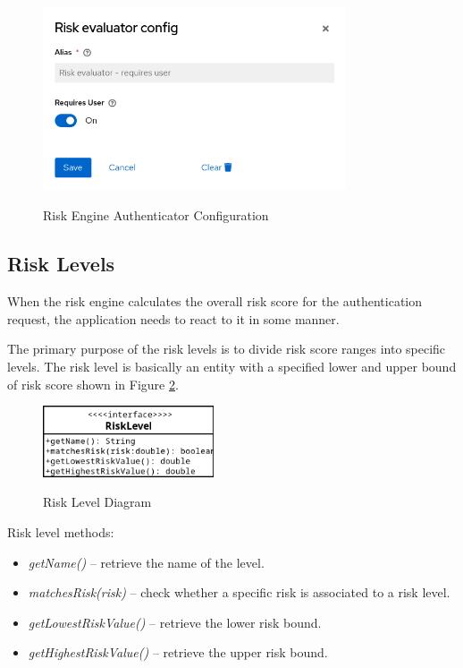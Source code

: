 \begin{figure}[htbp]
  \centering
  \includegraphics[width=0.8\textwidth]{img/sections/5-design/risk-evaluator-authenticator-config.png}
  \label{fig:risk-evaluator-authenticator-config}
  \caption{Risk Engine Authenticator Configuration}
\end{figure}

\newpage

\subsection{Risk Levels} \label{risk-levels}
When the risk engine calculates the overall risk score for the authentication request, the application needs to react to it in some manner.

The primary purpose of the risk levels is to divide risk score ranges into specific levels.
The risk level is basically an entity with a specified lower and upper bound of risk score shown in Figure \ref{fig:risk-level-diagram}.

\begin{figure}[htbp]
  \centering
  \includegraphics[width=0.45\textwidth]{img/sections/5-design/risk-level.png}
  \label{fig:risk-level-diagram}
  \caption{Risk Level Diagram}
\end{figure}

Risk level methods:
\begin{itemize}
    \item \textit{getName()} -- retrieve the name of the level.
    \item \textit{matchesRisk(risk)} -- check whether a specific risk is associated to a risk level.
    \item \textit{getLowestRiskValue()} -- retrieve the lower risk bound.
    \item \textit{getHighestRiskValue()} -- retrieve the upper risk bound.
\end{itemize}

